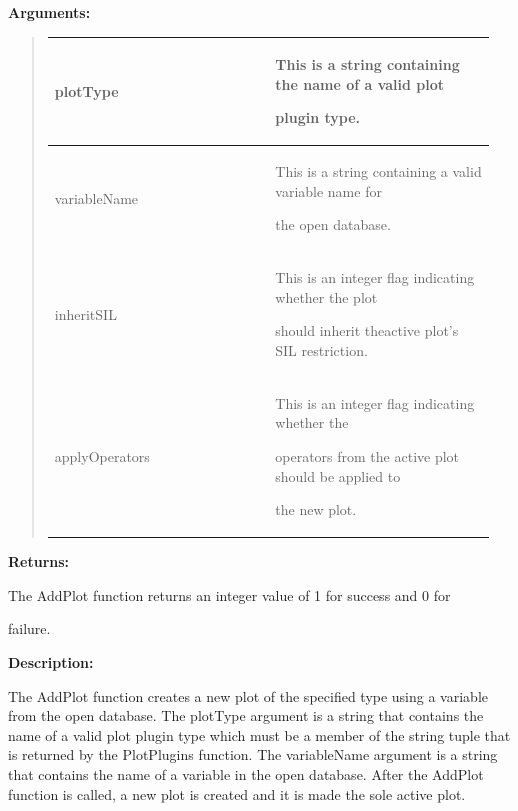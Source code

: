 \documentclass[letterpaper,10pt,english]{sphinxmanual}
\begin{document}
\begin{DUlineblock}{0em}
\item[] 
\item[] \textbf{Arguments:}
\end{DUlineblock}
\begin{quote}

\begin{tabular}{|p{0.475\linewidth}|p{0.475\linewidth}|}
\hline

plotType
 & 
\begin{DUlineblock}{0em}
\item[] This is a string containing the name of a valid plot
\item[] plugin type.
\end{DUlineblock}
\\
\hline
variableName
 & 
\begin{DUlineblock}{0em}
\item[] This is a string containing a valid variable name for
\item[] the open database.
\end{DUlineblock}
\\
\hline
inheritSIL
 & 
\begin{DUlineblock}{0em}
\item[] This is an integer flag indicating whether the plot
\item[] should inherit theactive plot's SIL restriction.
\end{DUlineblock}
\\
\hline
applyOperators
 & 
\begin{DUlineblock}{0em}
\item[] This is an integer flag indicating whether the
\item[] operators from the active plot should be applied to
\item[] the new plot.
\end{DUlineblock}
\\
\hline\end{tabular}

\end{quote}

\begin{DUlineblock}{0em}
\item[] 
\item[] \textbf{Returns:}
\item[] The AddPlot function returns an integer value of 1 for success and 0 for
\item[] failure.
\item[] 
\item[] \textbf{Description:}
\item[] The AddPlot function creates a new plot of the specified type using a
variable from the open database. The plotType argument is a string that
contains the name of a valid plot plugin type which must be a member of the
string tuple that is returned by the PlotPlugins function.
The variableName argument is a string that contains the name of a variable
in the open database. After the AddPlot function is called, a new plot is
created and it is made the sole active plot.
\end{DUlineblock}
\end{document}
